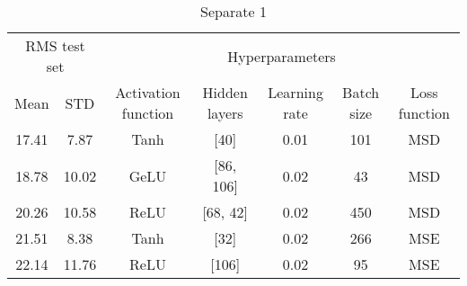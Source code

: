 \begin{table}[h]
    \centering
    \caption{Separate 1}
    \begin{tabular}{ccccccc}
        \toprule
        \multicolumn{2}{c}{RMS test set} & \multicolumn{5}{c}{Hyperparameters} \\
        \cmidrule(lr){1-2} 
        Mean & STD & Activation function & Hidden layers & Learning rate & Batch size & Loss function \\
        \midrule
        17.41 &  7.87 &       Tanh &        [40] &          0.01 &        101 & MSD \\
        18.78 & 10.02 &       GeLU &   [86, 106] &          0.02 &         43 & MSD \\
        20.26 & 10.58 &       ReLU &    [68, 42] &          0.02 &        450 & MSD \\
        21.51 &  8.38 &       Tanh &        [32] &          0.02 &        266 & MSE \\
        22.14 & 11.76 &       ReLU &       [106] &          0.02 &         95 & MSE \\
        \bottomrule
    \end{tabular}
\end{table}




